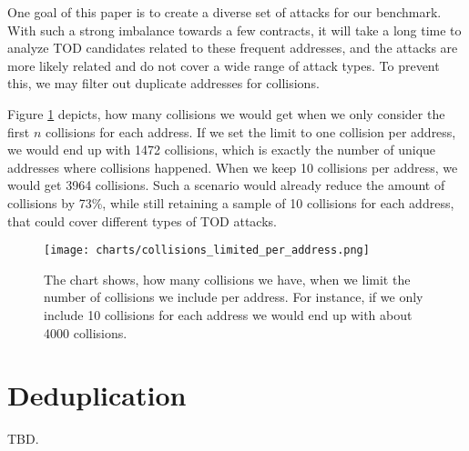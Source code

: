 \documentclass[draft,final]{vutinfth} %
\begin{document}
One goal of this paper is to create a diverse set of attacks for our benchmark. With such a strong imbalance towards a few contracts, it will take a long time to analyze TOD candidates related to these frequent addresses, and the attacks are more likely related and do not cover a wide range of attack types. To prevent this, we may filter out duplicate addresses for collisions.

Figure \ref{fig:collsions_address_limit} depicts, how many collisions we would get when we only consider the first $n$ collisions for each address. If we set the limit to one collision per address, we would end up with 1472 collisions, which is exactly the number of unique addresses where collisions happened. When we keep 10 collisions per address, we would get 3964 collisions. Such a scenario would already reduce the amount of collisions by 73\%, while still retaining a sample of 10 collisions for each address, that could cover different types of TOD attacks.

\begin{figure}[h]
    \centering
    \texttt{[image: charts/collisions\_limited\_per\_address.png]}
    \caption[Limit for collisions per address]{The chart shows, how many collisions we have, when we limit the number of collisions we include per address. For instance, if we only include 10 collisions for each address we would end up with about 4000 collisions.}
    \label{fig:collsions_address_limit}
\end{figure}

\section{Deduplication}

TBD.

\iffalse
    We want a diverse set of attacks for the benchmark, so we filter out similar attacks to the ones we already analyzed. For instance, it does not make sense to analyze 5000 attacks for the USDT Stablecoin, as these will mostly collide.

    If possible, we don't need the traces analyzer for deduplication. For instance, maybe we can get all the necessary information from the default RPC tracers.
    Alternatively, we could also download all necessary data, and then loop through the traces analyzer and only pick the relevant (deduplicated) potential attacks.

    Ideas, potentially a mixture of those:

    \begin{enumerate}
        \item only trace some attacks per contract
        \item only trace some attacks per function
        \item only trace some attacks per group of vulnerable contracts (as defined by analysis)
        \item only trace some attacks per contract/function skeletons
        \item similar to \cite{}, analyze at how many attacks per contract/function the number of found attacks saturate (based on the analysis result)
    \end{enumerate}
\fi
\end{document}
